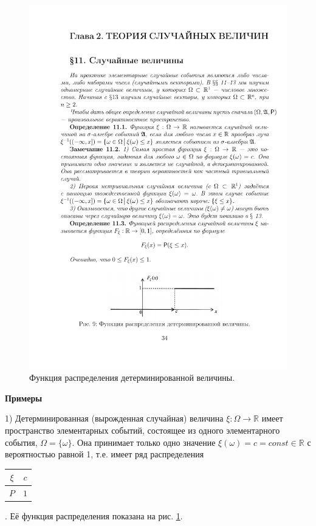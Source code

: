 \begin{figure}[h!]
	\centering
	\includegraphics[]{pic/pic9}
	\caption{Функция распределения детерминированной величины.}
	\label{fig9}
\end{figure}

\textbf{Примеры}

	1) Детерминированная (вырожденная случайная) величина $\xi : \Omega \rightarrow \mathbb{R}$ имеет пространство элементарных событий, состоящее
из одного элементарного события, $\Omega = \{\omega\}$. Она принимает только одно
значение $\xi(\omega)=c=const\in\mathbb{R}$ с вероятностью равной 1, т.е. имеет ряд
распределения 
\begin{tabular}{|c|c|}
\hline
$\xi$ & $c$\\ \hline
$P$ & $1$\\ \hline
\end{tabular}
. Её функция распределения показана на рис. \ref{fig9}.

